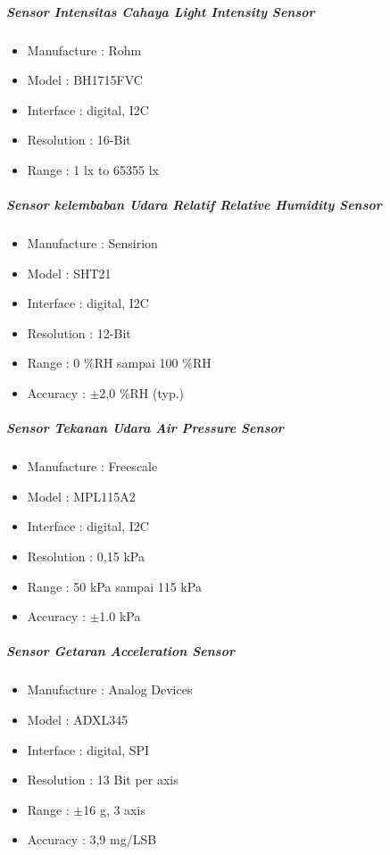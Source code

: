 \subparagraph{Sensor Intensitas Cahaya \textit{Light Intensity Sensor}}
\begin{itemize}
    \item Manufacture : Rohm
    \item Model : BH1715FVC
    \item Interface : digital, I2C
    \item Resolution : 16-Bit
    \item Range : 1 lx to 65355 lx
\end{itemize}

\subparagraph{Sensor kelembaban Udara Relatif \textit{Relative Humidity Sensor}}
\begin{itemize}
    \item Manufacture : Sensirion
    \item Model : SHT21
    \item Interface : digital, I2C
    \item Resolution : 12-Bit
    \item Range : 0 \%RH sampai 100 \%RH
    \item Accuracy : $\pm$2,0 \%RH (typ.)
\end{itemize}

\subparagraph{Sensor Tekanan Udara \textit{Air Pressure Sensor}}
\begin{itemize}
    \item Manufacture : Freescale
    \item Model : MPL115A2
    \item Interface : digital, I2C
    \item Resolution : 0,15 kPa
    \item Range : 50 kPa sampai 115 kPa
    \item Accuracy : $\pm$1.0 kPa
\end{itemize}

\subparagraph{Sensor Getaran \textit{Acceleration Sensor}}
\begin{itemize}
    \item Manufacture : Analog Devices
    \item Model : ADXL345
    \item Interface : digital, SPI
    \item Resolution : 13 Bit per axis
    \item Range : $\pm$16 g, 3 axis
    \item Accuracy : 3,9 mg/LSB
\end{itemize}

